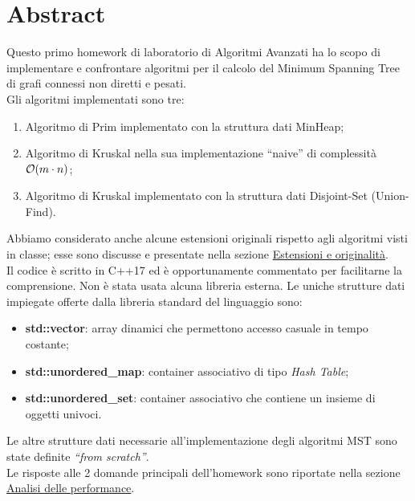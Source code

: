 \section{Abstract}
\label{cap:abstract}

Questo primo homework di laboratorio di Algoritmi Avanzati ha lo scopo di implementare e confrontare algoritmi per il calcolo del Minimum Spanning Tree di grafi connessi non diretti e pesati. \\

\noindent Gli algoritmi implementati sono tre:

\begin{enumerate}
    \item Algoritmo di Prim implementato con la struttura dati MinHeap;
    \item Algoritmo di Kruskal nella sua implementazione ``naive'' di complessità $\mathcal{O}(m \cdot n)$;
    \item Algoritmo di Kruskal implementato con la struttura dati Disjoint-Set (Union-Find).
\end{enumerate}

\noindent Abbiamo considerato anche alcune estensioni originali rispetto agli algoritmi visti in classe; esse sono discusse e presentate nella sezione \hyperref[cap:extensions-and-originalities]{Estensioni e originalità}. \\

\noindent Il codice è scritto in C++17 ed è opportunamente commentato per facilitarne la comprensione. Non è stata usata alcuna libreria esterna. Le uniche strutture dati impiegate offerte dalla libreria standard del linguaggio sono:

\begin{itemize}
    \item \textbf{std::vector}: array dinamici che permettono accesso casuale in tempo costante;
    \item \textbf{std::unordered\_map}: container associativo di tipo \textit{Hash Table};
    \item \textbf{std::unordered\_set}: container associativo che contiene un insieme di oggetti univoci.
\end{itemize}
Le altre strutture dati necessarie all'implementazione degli algoritmi MST sono state definite \textit{``from scratch''}. \\

\noindent Le risposte alle 2 domande principali dell'homework sono riportate nella sezione \hyperref[cap:performance-analysis]{Analisi delle performance}.
